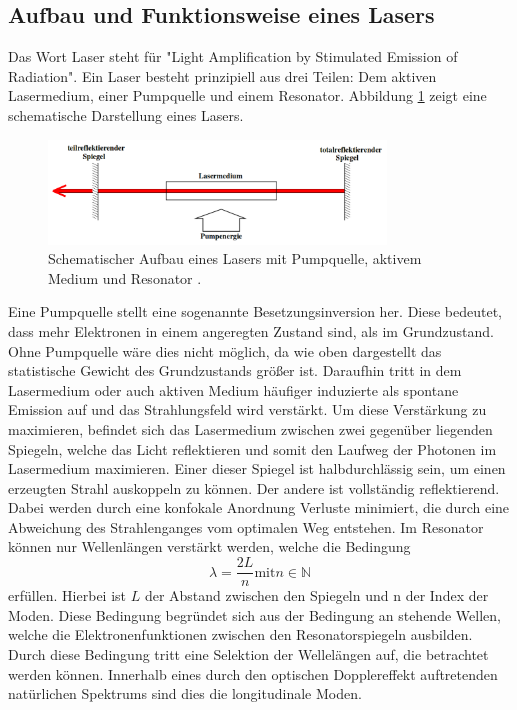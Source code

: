 \subsection{Aufbau und Funktionsweise eines Lasers}
Das Wort Laser steht für "Light Amplification by Stimulated Emission of Radiation".
Ein Laser besteht prinzipiell aus drei Teilen:
Dem aktiven Lasermedium, einer Pumpquelle und einem Resonator.
Abbildung \ref{pic:laser} zeigt eine schematische Darstellung eines Lasers.
\begin{figure}[htb]
  \centering
  \includegraphics[width=0.8\textwidth]{content/prinzip_laser.png}
  \caption{Schematischer Aufbau eines Lasers mit Pumpquelle, aktivem Medium und Resonator \cite{anleitung}.}
  \label{pic:laser}
\end{figure}
Eine Pumpquelle stellt eine sogenannte Besetzungsinversion her.
Diese bedeutet, dass mehr Elektronen in einem angeregten Zustand sind, als
im Grundzustand. Ohne Pumpquelle wäre dies nicht möglich, da wie oben
dargestellt das statistische Gewicht des Grundzustands größer ist.
Daraufhin tritt in dem Lasermedium oder auch aktiven Medium häufiger
induzierte als spontane Emission auf und das
Strahlungsfeld wird verstärkt.
Um diese Verstärkung zu maximieren, befindet sich das Lasermedium zwischen
zwei gegenüber liegenden Spiegeln, welche das Licht reflektieren und somit
den Laufweg der Photonen im Lasermedium maximieren.
Einer dieser Spiegel ist halbdurchlässig sein,
um einen erzeugten Strahl auskoppeln zu können. Der andere ist vollständig reflektierend.
Dabei werden durch eine konfokale Anordnung Verluste minimiert,
die durch eine Abweichung des Strahlenganges vom optimalen Weg entstehen.
Im Resonator können nur Wellenlängen verstärkt werden, welche die Bedingung
\begin{equation}
  \lambda = \frac{2L}{n} \text{mit} n\in\mathds{N}
\end{equation}
erfüllen.
Hierbei ist $L$ der Abstand zwischen den Spiegeln und n der Index der Moden.
Diese Bedingung begründet sich aus der Bedingung an stehende Wellen,
welche die Elektronenfunktionen zwischen den Resonatorspiegeln ausbilden.
Durch diese Bedingung tritt eine Selektion der Wellelängen auf, die betrachtet werden können.
Innerhalb eines durch den optischen Dopplereffekt auftretenden natürlichen Spektrums
sind dies die longitudinale Moden.

